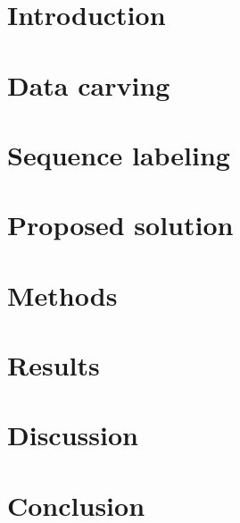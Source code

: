 \chapter{\label{chap:introduction}Introduction}
\chapter{\label{chap:datacarving}Data carving}
\chapter{\label{chap:sequencelabeling}Sequence labeling}
\chapter{\label{chap:proposedsolution}Proposed solution}
\chapter{\label{chap:methods}Methods}
\chapter{\label{chap:results}Results}
\chapter{\label{chap:discussion}Discussion}
\chapter{\label{chap:conclusion}Conclusion}

